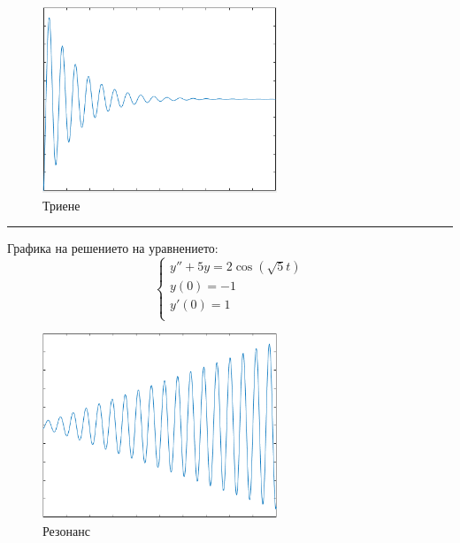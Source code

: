 \documentclass[11pt]{article}
\newcommand{\picturewidth}{7cm}
\begin{document}
\begin{figure}[H]
    \centering
    \includegraphics[width=\picturewidth]{pictures/triene.png}
    \caption{Триене}
    \label{fig:friction}
\end{figure}

\noindent
\hrule height 0.1pt
\vskip 0.2cm

Графика на решението на уравнението:
$$
\begin{cases}
    y'' + 5y = 2 \cos(\sqrt{5} t) \\
    y(0) = -1 \\
    y'(0) = 1 \\
\end{cases}
$$

\begin{figure}[H]
    \centering
    \includegraphics[width=\picturewidth]{pictures/resonans.png}
    \caption{Резонанс}
    \label{fig:resonance}
\end{figure}
\end{document}
